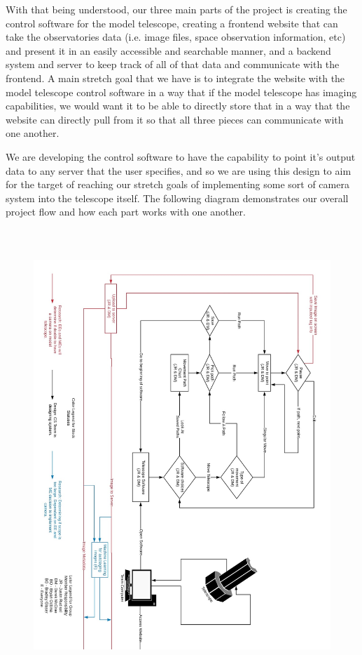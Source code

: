 \documentclass[12pt]{report}
\begin{document}
With that being understood, our three main parts of the project is creating the control software for the model telescope, creating a frontend website that can take the observatories data (i.e. image files, space observation information, etc) and present it in an easily accessible and searchable manner, and a backend system and server to keep track of all of that data and communicate with the frontend. A main stretch goal that we have is to integrate the website with the model telescope control software in a way that if the model telescope has imaging capabilities, we would want it to be able to directly store that in a way that the website can directly pull from it so that all three pieces can communicate with one another.

We are developing the control software to have the capability to point it’s output data to any server that the user specifies, and so we are using this design to aim for the target of reaching our stretch goals of implementing some sort of camera system into the telescope itself. The following diagram demonstrates our overall project flow and how each part works with one another.

\newpage


\begin{figure}[h]
	\centering
	\includegraphics[width=1.00\linewidth, height=17.0cm]{blockpt2}
\end{figure}
\end{document}
